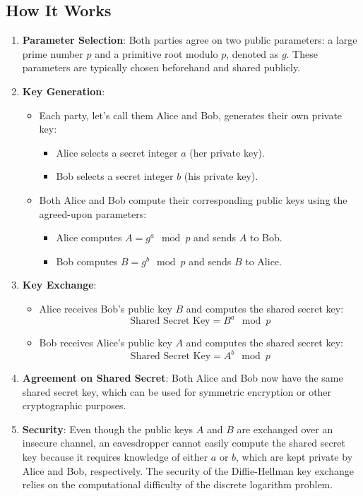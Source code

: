 \documentclass[11pt]{article}
\begin{document}
\subsection*{How It Works}

\begin{enumerate}
    \item \textbf{Parameter Selection}: Both parties agree on two public parameters: a large prime number $p$ and a primitive root modulo $p$, denoted as $g$. These parameters are typically chosen beforehand and shared publicly.
    
    \item \textbf{Key Generation}:
    \begin{itemize}
        \item Each party, let's call them Alice and Bob, generates their own private key:
        \begin{itemize}
            \item Alice selects a secret integer $a$ (her private key).
            \item Bob selects a secret integer $b$ (his private key).
        \end{itemize}
        \item Both Alice and Bob compute their corresponding public keys using the agreed-upon parameters:
        \begin{itemize}
            \item Alice computes $A = g^a \mod p$ and sends $A$ to Bob.
            \item Bob computes $B = g^b \mod p$ and sends $B$ to Alice.
        \end{itemize}
    \end{itemize}
    
    \item \textbf{Key Exchange}:
    \begin{itemize}
        \item Alice receives Bob's public key $B$ and computes the shared secret key:
        \[ \text{Shared Secret Key} = B^a \mod p \]
        \item Bob receives Alice's public key $A$ and computes the shared secret key:
        \[ \text{Shared Secret Key} = A^b \mod p \]
    \end{itemize}
    
    \item \textbf{Agreement on Shared Secret}: Both Alice and Bob now have the same shared secret key, which can be used for symmetric encryption or other cryptographic purposes.
    
    \item \textbf{Security}: Even though the public keys $A$ and $B$ are exchanged over an insecure channel, an eavesdropper cannot easily compute the shared secret key because it requires knowledge of either $a$ or $b$, which are kept private by Alice and Bob, respectively. The security of the Diffie-Hellman key exchange relies on the computational difficulty of the discrete logarithm problem.
\end{enumerate}
\end{document}
